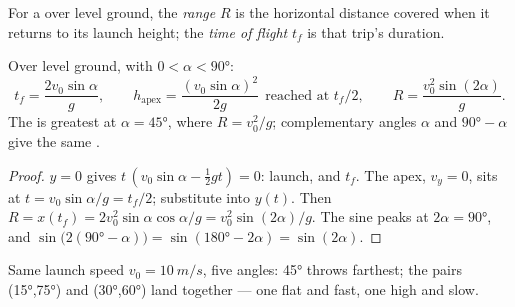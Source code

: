 \begin{definition}[Range]\label{def:g12:projectile-motion:range}
For a  over level ground, the \emph{range} $R$ is
the horizontal distance covered when it returns to its launch height; the
\emph{time of flight} $t_f$ is that trip's duration.
\end{definition}

\begin{proposition}\label{prop:g12:projectile-motion:range}
Over level ground, with $0 < \alpha < \ang{90}$:
\[
t_f = \frac{2 v_0 \sin\alpha}{g}, \qquad
h_{\text{apex}} = \frac{(v_0\sin\alpha)^2}{2g}
\ \ \text{reached at } t_f/2, \qquad
R = \frac{v_0^2 \sin(2\alpha)}{g}.
\]
The  is greatest at $\alpha = \ang{45}$, where $R = v_0^2/g$;
complementary angles $\alpha$ and $\ang{90} - \alpha$ give the same .
\end{proposition}

\begin{proof}
$y = 0$ gives $t\,(v_0\sin\alpha - \tfrac12 gt) = 0$: launch, and $t_f$.
The apex, $v_y = 0$, sits at $t = v_0\sin\alpha/g = t_f/2$; substitute into
$y(t)$. Then $R = x(t_f) = 2v_0^2\sin\alpha\cos\alpha/g =
v_0^2\sin(2\alpha)/g$. The sine peaks at $2\alpha = \ang{90}$, and
$\sin\bigl(2(\ang{90}-\alpha)\bigr) = \sin(\ang{180} - 2\alpha) =
\sin(2\alpha)$.
\end{proof}

\begin{omfigure}

{\small Same launch speed $v_0 = \qty{10}{m/s}$, five angles: \ang{45}
throws farthest; the pairs (\ang{15},\ang{75}) and (\ang{30},\ang{60})
land together --- one flat and fast, one high and slow.}
\end{omfigure}

